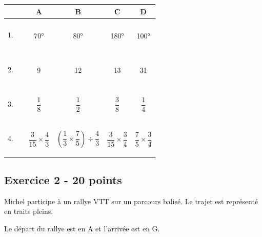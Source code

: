 \begin{multicols}{2}
    \begin{center} \begin{tabular}{|c|c|c|c|c|}  \hline
        & A & B & C & D \\ \hline
        1. $\phantom{\dfrac{\dfrac{1}{1}}{\dfrac{1}{1}}}$  & 70° & 80° & 180° & 100° \\ \hline
        2. $\phantom{\dfrac{\dfrac{1}{1}}{\dfrac{1}{1}}}$  &   9 &  12 &   13 & 31   \\ \hline
        3. $\phantom{\dfrac{\dfrac{1}{1}}{\dfrac{1}{1}}}$  & $\dfrac{1}{8}$ & $\dfrac{1}{2}$ & $\dfrac{3}{8}$ & $\dfrac{1}{4} $ \\ \hline
        4. $\phantom{\dfrac{\dfrac{1}{1}}{\dfrac{1}{1}}}$  & $\dfrac{3}{15} \times \dfrac{4}{3}$ & $\left(\dfrac{1}{3} \times \dfrac{7}{5} \right) \div \dfrac{4}{3}$ & $\dfrac{3}{15} \times \dfrac{3}{4}$ & $\dfrac{7}{5} \times \dfrac{3}{4} $  \\ \hline
    \end{tabular} \end{center}

\end{multicols}

\subsection*{Exercice 2 - 20 points}

Michel participe à un rallye VTT sur un parcours balisé. Le trajet est représenté en traits pleins.

Le départ du rallye est en A et l'arrivée est en G.


